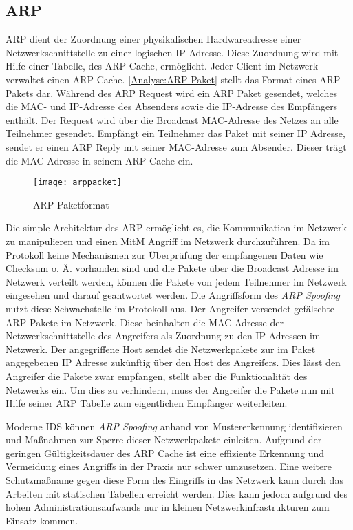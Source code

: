 \subsection{\ac{ARP}}
\label{Analyse:ARP}
\ac{ARP} dient der Zuordnung einer physikalischen Hardwareadresse einer Netzwerkschnittstelle zu einer logischen \ac{IP} Adresse. Diese Zuordnung wird mit Hilfe einer Tabelle, des \ac{ARP}-Cache, ermöglicht. Jeder Client im Netzwerk verwaltet einen \ac{ARP}-Cache. \autoref{Analyse:ARP Paket} stellt das Format eines \ac{ARP} Pakets dar. Während des \ac{ARP} Request wird ein \ac{ARP} Paket gesendet, welches die MAC- und \ac{IP}-Adresse des Absenders sowie die \ac{IP}-Adresse des Empfängers enthält. Der Request wird über die Broadcast MAC-Adresse des Netzes an alle Teilnehmer gesendet. Empfängt ein Teilnehmer das Paket mit seiner \ac{IP} Adresse, sendet er einen \ac{ARP} Reply mit seiner MAC-Adresse zum Absender. Dieser trägt die MAC-Adresse in seinem \ac{ARP} Cache ein.

\begin{figure}[h]
  \centering
  \texttt{[image: arppacket]}
  \caption{ARP Paketformat}
  \label{Analyse:ARP Paket}
\end{figure}

Die simple Architektur des \ac{ARP} ermöglicht es, die Kommunikation im Netzwerk zu manipulieren und einen \ac{MitM} Angriff im Netzwerk durchzuführen. Da im Protokoll keine Mechanismen zur Überprüfung der empfangenen Daten wie Checksum o. Ä. vorhanden sind und die Pakete über die Broadcast Adresse im Netzwerk verteilt werden, können die Pakete von jedem Teilnehmer im Netzwerk eingesehen und darauf geantwortet werden. Die Angriffsform des \textit{\ac{ARP} Spoofing} nutzt diese Schwachstelle im Protokoll aus. Der Angreifer versendet gefälschte \ac{ARP} Pakete im Netzwerk. Diese beinhalten die MAC-Adresse der Netzwerkschnittstelle des Angreifers als Zuordnung zu den \ac{IP} Adressen im Netzwerk. Der angegriffene Host sendet die Netzwerkpakete zur im Paket angegebenen \ac{IP} Adresse zukünftig über den Host des Angreifers. Dies lässt den Angreifer die Pakete zwar empfangen, stellt aber die Funktionalität des Netzwerks ein. Um dies zu verhindern, muss der Angreifer die Pakete nun mit Hilfe seiner \ac{ARP} Tabelle zum eigentlichen Empfänger weiterleiten.

Moderne \ac{IDS} können \textit{\ac{ARP} Spoofing} anhand von Mustererkennung identifizieren und Maßnahmen zur Sperre dieser Netzwerkpakete einleiten. Aufgrund der geringen Gültigkeitsdauer des \ac{ARP} Cache ist eine effiziente Erkennung und Vermeidung eines Angriffs in der Praxis nur schwer umzusetzen. Eine weitere Schutzmaßname gegen diese Form des Eingriffs in das Netzwerk kann durch das Arbeiten mit statischen Tabellen erreicht werden. Dies kann jedoch aufgrund des hohen Administrationsaufwands nur in kleinen Netzwerkinfrastrukturen zum Einsatz kommen.

